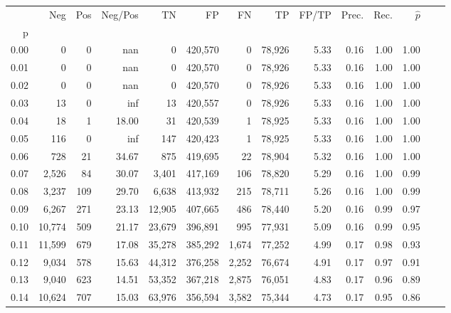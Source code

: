 \begin{tabular}{rrrrrrrrrrrrrr}
\toprule
{} &     Neg &    Pos & Neg/Pos &       TN &       FP &      FN &      TP & FP/TP & Prec. &  Rec. & $\hat{p}$ \\
p    &         &        &         &          &          &         &         &       &       &       &           \\
\midrule
0.00 &       0 &      0 &     nan &        0 &  420,570 &       0 &  78,926 &  5.33 &  0.16 &  1.00 &      1.00 \\
0.01 &       0 &      0 &     nan &        0 &  420,570 &       0 &  78,926 &  5.33 &  0.16 &  1.00 &      1.00 \\
0.02 &       0 &      0 &     nan &        0 &  420,570 &       0 &  78,926 &  5.33 &  0.16 &  1.00 &      1.00 \\
0.03 &      13 &      0 &     inf &       13 &  420,557 &       0 &  78,926 &  5.33 &  0.16 &  1.00 &      1.00 \\
0.04 &      18 &      1 &   18.00 &       31 &  420,539 &       1 &  78,925 &  5.33 &  0.16 &  1.00 &      1.00 \\
0.05 &     116 &      0 &     inf &      147 &  420,423 &       1 &  78,925 &  5.33 &  0.16 &  1.00 &      1.00 \\
0.06 &     728 &     21 &   34.67 &      875 &  419,695 &      22 &  78,904 &  5.32 &  0.16 &  1.00 &      1.00 \\
0.07 &   2,526 &     84 &   30.07 &    3,401 &  417,169 &     106 &  78,820 &  5.29 &  0.16 &  1.00 &      0.99 \\
0.08 &   3,237 &    109 &   29.70 &    6,638 &  413,932 &     215 &  78,711 &  5.26 &  0.16 &  1.00 &      0.99 \\
0.09 &   6,267 &    271 &   23.13 &   12,905 &  407,665 &     486 &  78,440 &  5.20 &  0.16 &  0.99 &      0.97 \\
0.10 &  10,774 &    509 &   21.17 &   23,679 &  396,891 &     995 &  77,931 &  5.09 &  0.16 &  0.99 &      0.95 \\
0.11 &  11,599 &    679 &   17.08 &   35,278 &  385,292 &   1,674 &  77,252 &  4.99 &  0.17 &  0.98 &      0.93 \\
0.12 &   9,034 &    578 &   15.63 &   44,312 &  376,258 &   2,252 &  76,674 &  4.91 &  0.17 &  0.97 &      0.91 \\
0.13 &   9,040 &    623 &   14.51 &   53,352 &  367,218 &   2,875 &  76,051 &  4.83 &  0.17 &  0.96 &      0.89 \\
0.14 &  10,624 &    707 &   15.03 &   63,976 &  356,594 &   3,582 &  75,344 &  4.73 &  0.17 &  0.95 &      0.86 \\

\end{tabular}
